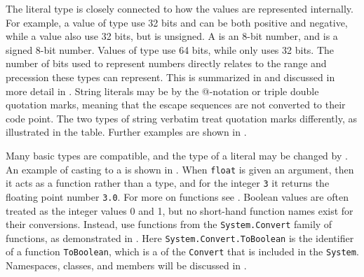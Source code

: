 \documentclass[fsharpNotes.tex]{subfiles}
\begin{document}
The literal type is closely connected to how the values are represented internally. For example, a value of type  use 32 bits and can be both positive and negative, while a  value also use 32 bits, but is unsigned. A  is an 8-bit number, and  is a signed 8-bit number. Values of type  use 64 bits, while  only uses 32 bits. The number of bits used to represent numbers directly relates to the range and precession these types can represent. This is summarized in  and discussed in more detail in . String literals may be  by the @-notation or triple double quotation marks, meaning that the escape sequences are not converted to their code point. The two types of string verbatim treat quotation marks differently, as illustrated in the table. Further examples are shown in .
%
%
%
%

Many basic types are compatible, and the type of a literal may be changed by . An example of casting to a  is shown in .
%
% 
When \lstinline|float| is given an argument, then it acts as a function rather than a type, and for the integer \lstinline|3| it returns the floating point number \lstinline|3.0|.  For more on functions see . Boolean values are often treated as the integer values 0 and 1, but no short-hand function names exist for their conversions. Instead, use functions from the \lstinline{System.Convert} family of functions, as demonstrated in .
%
% 
Here \lstinline|System.Convert.ToBoolean| is the identifier of a function \lstinline|ToBoolean|, which is a  of the  \lstinline|Convert| that is included in the  \lstinline|System|. Namespaces, classes, and members will be discussed in .
\end{document}
